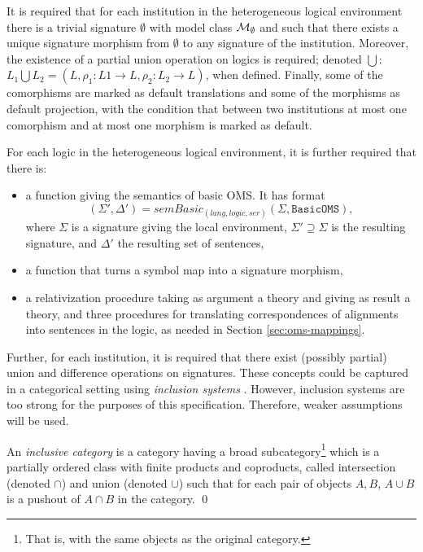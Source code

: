 \documentclass[10pt,fleqn,final]{scrreprt}
\newcommand{\cbs}[0]{\color{red}\xspace} %
\newcommand{\cbe}[0]{\color{black}\xspace} %
\newcommand*{\syntax}[1]{\texttt{#1}}
\newenvironment{definitions}[0]{\medskip }{}
\begin{document}
\begin{definitions}
\cbs It is required that\cbe for each institution in the heterogeneous logical environment there is a trivial signature
$\emptyset$ with model class ${\cal M}_\emptyset$ and such that there exists a unique signature morphism
from $\emptyset$ to any signature of the institution.\cbs Moreover, the existence of a partial union operation on logics is required; denoted $\bigcup$:\cbe 
$L_1 \bigcup L_2 = (L, \rho_1:L1 \to L, \rho_2 : L_2 \to L)$, when defined. Finally, some of the comorphisms are marked as default translations and some of the morphisms as default projection, with the condition that between two institutions at most one comorphism 
and at most one morphism is marked as default.

For each logic in the heterogeneous logical environment,\cbs it is further required that there is:\cbe

\begin{itemize}
  \item \cbs a function giving the semantics of basic OMS. It has format 
$$(\Sigma',\Delta')=\mathit{semBasic}_{(lang,logic,ser)}(\Sigma,\syntax{BasicOMS}),$$ where $\Sigma$ is a
signature giving the local environment,  $\Sigma'\supseteq\Sigma$ is
the resulting signature, and $\Delta'$ the resulting set of sentences,\cbe
  \item a function that turns a symbol map into a signature morphism,
  \item a relativization procedure taking as argument a theory and giving as 
  result a theory, and three procedures for translating correspondences of alignments
  into sentences in the logic, as needed in Section \ref{sec:oms-mappings}.
\end{itemize}


Further,  for each institution, it is required that there exist (possibly partial) union and difference operations on signatures.
These concepts could be captured in a categorical setting using \emph{inclusion systems} \cite{DGS91}.
\cbs However, inclusion systems are too strong for the purposes of this specification.  Therefore, weaker assumptions will be used.\cbe

\begin{definition}  
 An \emph{inclusive category} \cite{DBLP:conf/birthday/GoguenR04} 
 is a category having a broad subcategory\footnote{That is, with the same objects as the original category.}
which is a partially ordered class with finite products and coproducts, called intersection (denoted $\cap$) and union
(denoted $\cup$) such that for each pair of objects $A, B$, $A \cup B$ is a pushout of $A \cap B$ in the category.
\qed \end{definition}


\end{definitions}
\end{document}
